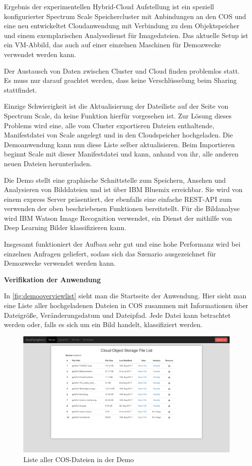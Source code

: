 Ergebnis der experimentellen Hybrid-Cloud Aufstellung ist ein speziell konfigurierter Spectrum Scale Speichercluster mit Anbindungen an den \ac{COS} und eine neu entwickeltet Cloudanwendung mit Verbindung zu dem Objektspeicher und einem exemplarischen Analysedienst für Imagedateien.
Das aktuelle Setup ist ein VM-Abbild, das auch auf einer einzelnen Maschinen für Demozwecke verwendet werden kann.

Der Austausch von Daten zwischen Cluster und Cloud finden problemlos statt. Es muss nur darauf geachtet werden, dass keine Verschlüsselung beim Sharing stattfindet.

Einzige Schwierigkeit ist die Aktualisierung der Dateiliste auf der Seite von Spectrum Scale, da keine Funktion hierfür vorgesehen ist. Zur Lösung dieses Problems wird eine, alle vom Cluster exportieren Dateien enthaltende, Manifestdatei von Scale angelegt und in den Cloudspeicher hochgeladen. Die Demoanwendung kann nun diese Liste selber aktualisieren. Beim Importieren beginnt Scale mit dieser Manifestdatei und kann, anhand von ihr, alle anderen neuen Dateien herunterladen.

Die Demo stellt eine graphische Schnittstelle zum Speichern, Ansehen und Analysieren von Bilddateien und ist über IBM Bluemix erreichbar. Sie wird von einem express Server präsentiert, der ebenfalls eine einfache REST-API zum verwenden der oben beschriebenen Funktionen bereitstellt. Für die Bildanalyse wird IBM Watson Image Recognition verwendet, ein Dienst der mithilfe von Deep Learning Bilder klassifizieren kann.

Insgesamt funktioniert der Aufbau sehr gut und eine hohe Performanz wird bei einzelnen Anfragen geliefert, sodass sich das Szenario ausgezeichnet für Demozwecke verwendet werden kann.

\textbf{Verifikation der Anwendung}

In \autoref{fig:demooverviewlist} sieht man die Startseite der Anwendung. Hier sieht man eine Liste aller hochgeladenen Dateien in \ac{COS} zusammen mit Informationen über Dateigröße, Veränderungsdatum und Dateipfad. Jede Datei kann betrachtet werden oder, falls es sich um ein Bild handelt, klassifiziert werden. 

\begin{figure}[hbt]
	\centering
	\includegraphics[scale=0.25]{images/demo-overview-list}
	\caption{Liste aller COS-Dateien in der Demo}
	\label{fig:demooverviewlist}
\end{figure}

